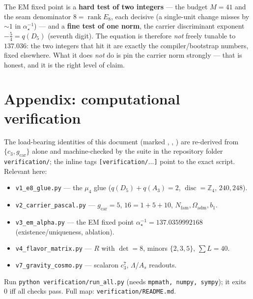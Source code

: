 \documentclass[11pt,a4paper]{article}
\newcommand{\gcar}{g_{\mathrm{car}}}
\newcommand{\Nfam}{N_{\mathrm{fam}}}
\newcommand{\Oadm}{\Omega_{\mathrm{adm}}}
\newcommand{\cthree}{c_3}
\newcommand{\ainv}{\alpha^{-1}_\star}
\newcommand{\Z}{\mathbb{Z}}
\theoremstyle{definition}
\begin{document}
\begin{keybox}
The EM fixed point is a \textbf{hard test of two integers} --- the budget $M=41$ and the seam denominator
$8=\operatorname{rank}E_8$, each decisive (a single-unit change misses by $\sim1$ in $\ainv$) --- and a
\textbf{fine test of one norm}, the carrier discriminant exponent $-\tfrac54=q(D_5)$ (seventh digit). The
equation is therefore \emph{not} freely tunable to $137.036$: the two integers that hit it are exactly the
compiler/bootstrap numbers, fixed elsewhere. What it does \emph{not} do is pin the carrier norm strongly
--- that is honest, and it is the right level of claim. \mE
\end{keybox}

\section*{Appendix: computational verification}
The load-bearing identities of this document (marked \mE, \mE, \mE) are re-derived from
$\{\cthree,\gcar\}$ alone and machine-checked by the suite in the repository folder
\texttt{verification/}; the inline tags \texttt{[verification/$\dots$]} point to the exact script.
Relevant here:
\begin{itemize}[leftmargin=1.4em,itemsep=1pt]
\item \texttt{v1\_e8\_glue.py} --- the $\mu_4$ glue ($q(D_5){+}q(A_3){=}2$, $\operatorname{disc}{=}\Z_4$, $240,248$).
\item \texttt{v2\_carrier\_pascal.py} --- $\gcar{=}5$, $16{=}1{+}5{+}10$, $\Nfam,\Oadm,b_1$.
\item \texttt{v3\_em\_alpha.py} --- the EM fixed point $\ainv{=}137.0359992168$ (existence/uniqueness, ablation).
\item \texttt{v4\_flavor\_matrix.py} --- $R$ with $\det{=}8$, minors $\{2,3,5\}$, $\sum L{=}40$.
\item \texttt{v7\_gravity\_cosmo.py} --- scalaron $\cthree^7$, $\Lambda$/$A_s$ readouts.
\end{itemize}
Run \texttt{python verification/run\_all.py} (needs \texttt{mpmath, numpy, sympy}); it exits $0$ iff all
checks pass. Full map: \texttt{verification/README.md}.


\end{document}
